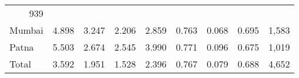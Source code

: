 \begin{table}[!h]
\begin{tabular}{lllllllll}
  \multicolumn{1}{r}{939} \\
\multicolumn{1}{l}{\hspace{1em}Mumbai} &
  \multicolumn{1}{|r}{4.898} &
  \multicolumn{1}{r}{3.247} &
  \multicolumn{1}{r}{2.206} &
  \multicolumn{1}{r}{2.859} &
  \multicolumn{1}{r}{0.763} &
  \multicolumn{1}{r}{0.068} &
  \multicolumn{1}{r}{0.695} &
  \multicolumn{1}{r}{1,583} \\
\multicolumn{1}{l}{\hspace{1em}Patna} &
  \multicolumn{1}{|r}{5.503} &
  \multicolumn{1}{r}{2.674} &
  \multicolumn{1}{r}{2.545} &
  \multicolumn{1}{r}{3.990} &
  \multicolumn{1}{r}{0.771} &
  \multicolumn{1}{r}{0.096} &
  \multicolumn{1}{r}{0.675} &
  \multicolumn{1}{r}{1,019} \\
\multicolumn{1}{l}{\hspace{1em}Total} &
  \multicolumn{1}{|r}{3.592} &
  \multicolumn{1}{r}{1.951} &
  \multicolumn{1}{r}{1.528} &
  \multicolumn{1}{r}{2.396} &
  \multicolumn{1}{r}{0.767} &
  \multicolumn{1}{r}{0.079} &
  \multicolumn{1}{r}{0.688} &
  \multicolumn{1}{r}{4,652} \\
\cline{1-9}
\end{tabular}
\end{table}
